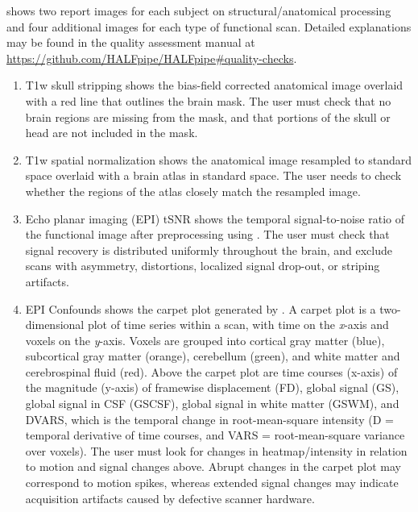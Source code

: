 shows two report images for each subject on
structural/anatomical processing and four additional images for each type
of functional scan. Detailed explanations may be found in the quality
assessment manual at
\url{https://github.com/HALFpipe/HALFpipe\#quality-checks}.

\begin{enumerate}[leftmargin=*]

\item

T1w skull stripping shows the bias-field corrected anatomical image
overlaid with a red line that outlines the brain mask. The user must check
that no brain regions are missing from the mask, and that portions of the
skull or head are not included in the mask.

\item

T1w spatial normalization shows the anatomical image resampled to standard
space overlaid with a brain atlas in standard space. The user needs to
check whether the regions of the atlas closely match the resampled image.

\item

Echo planar imaging (EPI) tSNR shows the temporal signal-to-noise ratio of
the functional image after preprocessing using . The user
must check that signal recovery is distributed uniformly throughout the
brain, and exclude scans with asymmetry, distortions, localized signal
drop-out, or striping artifacts.

\item

EPI Confounds shows the carpet plot
\parencite{10.1016/j.neuroimage.2016.08.009,10.1016/j.neuroimage.2020.116614}
generated by . A carpet plot is a two-dimensional plot of
time series within a scan, with time on the \emph{x}-axis and voxels on the
\emph{y}-axis. Voxels are grouped into cortical gray matter (blue),
subcortical gray matter (orange), cerebellum (green), and white matter and
cerebrospinal fluid (red). Above the carpet plot are time courses (x-axis)
of the magnitude (y-axis) of framewise displacement (FD), global signal
(GS), global signal in CSF (GSCSF), global signal in white matter (GSWM),
and DVARS, which is the temporal change in root-mean-square intensity (D =
temporal derivative of time courses, and VARS = root-mean-square variance
over voxels). The user must look for changes in heatmap/intensity in
relation to motion and signal changes above. Abrupt changes in the carpet
plot may correspond to motion spikes, whereas extended signal changes may
indicate acquisition artifacts caused by defective scanner hardware.


\end{enumerate}
